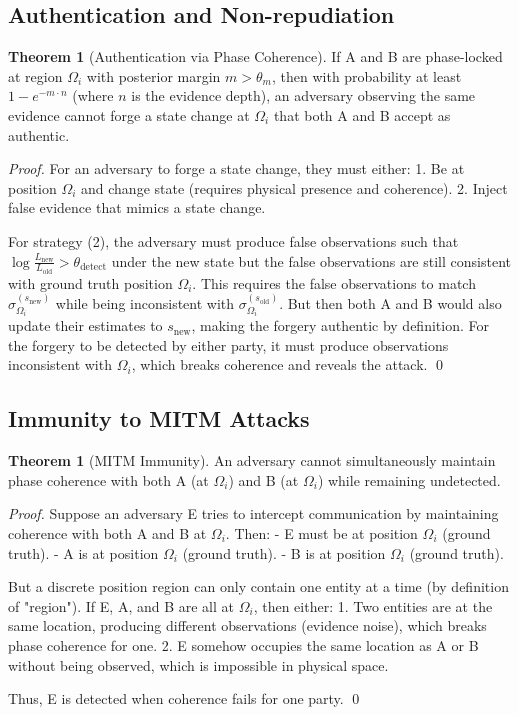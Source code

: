 \documentclass[11pt,a4paper]{article}
\theoremstyle{definition}
\newtheorem{theorem}[definition]{Theorem}
\begin{document}
\subsection{Authentication and Non-repudiation}

\begin{theorem}[Authentication via Phase Coherence]
If A and B are phase-locked at region $\Omega_i$ with posterior margin $m > \theta_m$, then with probability at least $1 - e^{-m \cdot n}$ (where $n$ is the evidence depth), an adversary observing the same evidence cannot forge a state change at $\Omega_i$ that both A and B accept as authentic.
\end{theorem}

\begin{proof}
For an adversary to forge a state change, they must either:
1. Be at position $\Omega_i$ and change state (requires physical presence and coherence).
2. Inject false evidence that mimics a state change.

For strategy (2), the adversary must produce false observations such that $\log \frac{L_{\text{new}}}{L_{\text{old}}} > \theta_{\text{detect}}$ under the new state but the false observations are still consistent with ground truth position $\Omega_i$. This requires the false observations to match $\sigma_{\Omega_i}^{(s_{\text{new}})}$ while being inconsistent with $\sigma_{\Omega_i}^{(s_{\text{old}})}$. But then both A and B would also update their estimates to $s_{\text{new}}$, making the forgery authentic by definition. For the forgery to be detected by either party, it must produce observations inconsistent with $\Omega_i$, which breaks coherence and reveals the attack. \qed
\end{proof}

\subsection{Immunity to MITM Attacks}

\begin{theorem}[MITM Immunity]
An adversary cannot simultaneously maintain phase coherence with both A (at $\Omega_i$) and B (at $\Omega_i$) while remaining undetected.
\end{theorem}

\begin{proof}
Suppose an adversary E tries to intercept communication by maintaining coherence with both A and B at $\Omega_i$. Then:
- E must be at position $\Omega_i$ (ground truth).
- A is at position $\Omega_i$ (ground truth).
- B is at position $\Omega_i$ (ground truth).

But a discrete position region can only contain one entity at a time (by definition of "region"). If E, A, and B are all at $\Omega_i$, then either:
1. Two entities are at the same location, producing different observations (evidence noise), which breaks phase coherence for one.
2. E somehow occupies the same location as A or B without being observed, which is impossible in physical space.

Thus, E is detected when coherence fails for one party. \qed
\end{proof}
\end{document}

